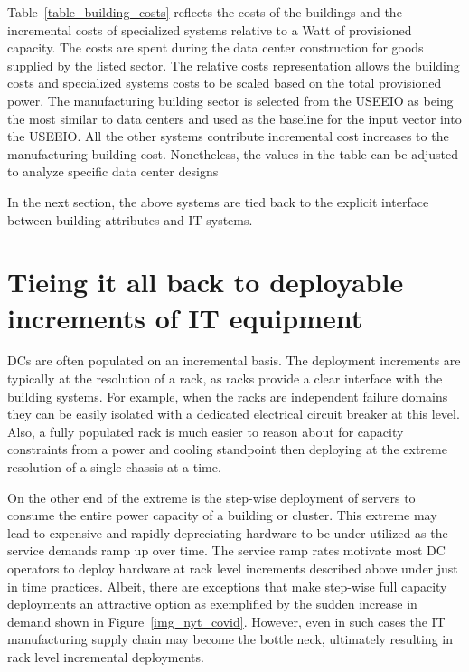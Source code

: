         
        
        Table~\ref{table_building_costs} reflects the costs of the buildings and the incremental costs of specialized systems relative to a Watt of provisioned capacity. The costs are spent during the data center construction for goods supplied by the listed sector. The relative costs representation allows the building costs and specialized systems costs to be scaled based on the total provisioned power. The manufacturing building sector is selected from the USEEIO as being the most similar to data centers and used as the baseline for the input vector into the USEEIO. All the other systems contribute incremental cost increases to the manufacturing building cost. Nonetheless, the values in the table can be adjusted to analyze specific data center designs
        
        In the next section, the above systems are tied back to the explicit interface between building attributes and IT systems.
        
    \section{Tieing it all back to deployable increments of IT equipment}
    \label{sec: tieing it together}
    
    DCs are often populated on an incremental basis. The deployment increments are typically at the resolution of a rack, as racks provide a clear interface with the building systems. For example, when the racks are independent failure domains they can be easily isolated with a dedicated electrical circuit breaker at this level. Also, a fully populated rack is much easier to reason about for capacity constraints from a power and cooling standpoint then deploying at the extreme resolution of a single chassis at a time. 
    
    On the other end of the extreme is the step-wise deployment of servers to consume the entire power capacity of a building or cluster. This extreme may lead to expensive and rapidly depreciating hardware to be under utilized as the service demands ramp up over time. The service ramp rates motivate most DC operators to deploy hardware at rack level increments described above under just in time practices. Albeit, there are exceptions that make step-wise full capacity deployments an attractive option as exemplified by the sudden increase in demand shown in Figure~\ref{img_nyt_covid}. However, even in such cases the IT manufacturing supply chain may become the bottle neck, ultimately resulting in rack level incremental deployments.
    
